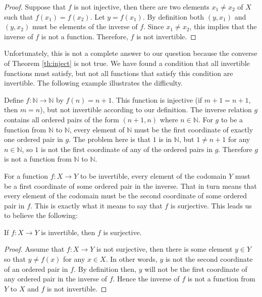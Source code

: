 \begin{proof}
Suppose that $f$ is not injective, then there are two elements $x_1\neq x_2$ of $X$ such that $f(x_1)=f(x_2)$.  Let $y=f(x_1)$.  By definition both $(y,x_1)$ and $(y,x_2)$ must be elements of the inverse of $f$. Since $x_1\neq x_2$, this implies that the inverse of $f$ is not a function.  Therefore, $f$ is not invertible.
\end{proof}

Unfortunately, this is not a complete answer to our question because the converse of Theorem \ref{th:inject} is not true.  We have found a condition that all invertible functions must satisfy, but not all functions that satisfy this condition are invertible.  The following example illustrates the difficulty.

\begin{example}
Define $f:\mathbb N\to\mathbb N$ by $f(n)=n+1$.  This function is injective (if $m+1=n+1$, then $m=n$), but not invertible according to our definition.  The inverse relation $g$ contains all ordered pairs of the form $(n+1,n)$ where $n\in\mathbb N$.  For $g$ to be a function from $\mathbb N$ to $\mathbb N$, every element of $\mathbb N$ must be the first coordinate of exactly one ordered pair in $g$.  The problem here is that $1$ is in $\mathbb N$, but $1\neq n+1$ for any $n\in \mathbb N$, so $1$ is not the first coordinate of any of the ordered pairs in $g$. Therefore $g$ is not a function from $\mathbb N$ to $\mathbb N$.
\end{example}

For a function $f:X\to Y$ to be invertible, every element of the codomain $Y$ must be a first coordinate of some ordered pair in the inverse.  That in turn means that every element of the codomain must be the second coordinate of some ordered pair in $f$.  This is exactly what it means to say that $f$ is surjective.  This leads us to believe the following:

\begin{thrm}\label{th:surject}
If $f:X\to Y$ is invertible, then $f$ is surjective.
\end{thrm}

\begin{proof}
Assume that $f:X\to Y$ is not surjective, then there is some element $y\in Y$ so that $y\neq f(x)$ for any $x\in X$.  In other words, $y$ is not the second coordinate of an ordered pair in $f$.  By definition then, $y$ will not be the first coordinate of any ordered pair in the inverse of $f$.  Hence the inverse of $f$ is not a function from $Y$ to $X$ and $f$ is not invertible.
\end{proof}

